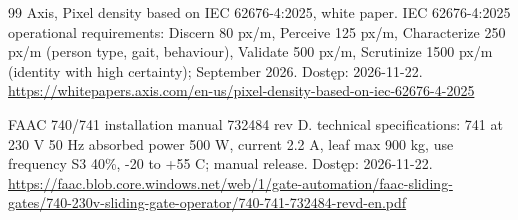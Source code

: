 \begin{thebibliography}{99}
 Axis, Pixel density based on IEC 62676-4:2025, white paper. IEC 62676-4:2025 operational requirements: Discern 80 px/m, Perceive 125 px/m, Characterize 250 px/m (person type, gait, behaviour), Validate 500 px/m, Scrutinize 1500 px/m (identity with high certainty); September 2026. Dostęp: 2026-11-22.
\url{https://whitepapers.axis.com/en-us/pixel-density-based-on-iec-62676-4-2025}

 FAAC 740/741 installation manual 732484 rev D. technical specifications: 741 at 230 V 50 Hz absorbed power 500 W, current 2.2 A, leaf max 900 kg, use frequency S3 40\%, -20 to +55 C; manual release. Dostęp: 2026-11-22.
\url{https://faac.blob.core.windows.net/web/1/gate-automation/faac-sliding-gates/740-230v-sliding-gate-operator/740-741-732484-revd-en.pdf}

\end{thebibliography}

